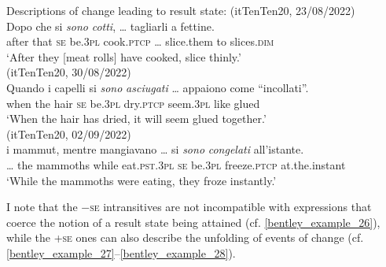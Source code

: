 \documentclass[output=paper,colorlinks,citecolor=brown
]{langscibook}
\begin{document}
\ea \label{bentley_example_25}
    Descriptions of change leading to result state:
    \ea  \label{bentley_example_25a}(itTenTen20, 23/08/2022)\\
    \gll Dopo che	si 		\textit{sono} 		\textit{cotti},  {\ldots}  tagliarli			a fettine.\\
   				after		that	\textsc{se}		be.3\textsc{pl}	cook.\textsc{ptcp}	{\ldots} slice.them	to	slices.\textsc{dim}\\
    \glt ‘After they [meat rolls] have cooked, slice thinly.’ \\
    \ex \label{bentley_example_25b}(itTenTen20, 30/08/2022)\\
    \gll Quando		i		capelli	si		\textit{sono} 		\textit{asciugati}  {\ldots}  appaiono		come “incollati”.\\
    when			the	hair			\textsc{se}		be.3\textsc{pl}	dry.\textsc{ptcp}	{}					seem.3\textsc{pl}		like			glued	{} \\
    \glt 					‘When the hair has dried, it will seem glued together.’ \\
    \ex \label{bentley_example_25c}(itTenTen20, 02/09/2022)\\
    \gll  {\ldots}  i			mammut,		mentre		mangiavano  {\ldots}  si 		\textit{sono} 		\textit{congelati} 		all’istante.\\
    {\ldots} 									the	mammoths	while			eat.\textsc{pst}.3\textsc{pl}			{}			\textsc{se}		be.3\textsc{pl}	freeze.\textsc{ptcp}	 at.the.instant	{} \\
    \glt 									‘While the mammoths	 were eating, they froze instantly.’ \\
    \z
\z

I note that the −\textsc{se} intransitives are not incompatible with expressions that coerce the notion of a result state being attained (cf. \ref{bentley_example_26}), while the +\textsc{se} ones can also describe the unfolding of events of change (cf. \ref{bentley_example_27}--\ref{bentley_example_28}).
\end{document}
